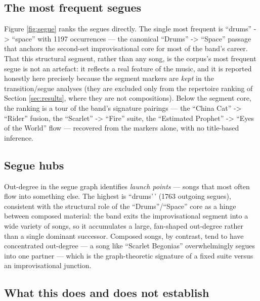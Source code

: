 \documentclass[
]{article}
\begin{document}
\subsection{The most frequent segues}\label{the-most-frequent-segues}

Figure \ref{fig:segue} ranks the segues directly. The single most
frequent is ``drums'' -\textgreater{} ``space'' with 1197 occurrences
--- the canonical ``Drums'' -\textgreater{} ``Space'' passage that
anchors the second-set improvisational core for most of the band's
career. That this structural segment, rather than any song, is the
corpus's most frequent segue is not an artefact: it reflects a real
feature of the music, and it is reported honestly here precisely because
the segment markers are \emph{kept} in the transition/segue analyses
(they are excluded only from the repertoire ranking of Section
\ref{sec:results}, where they are not compositions). Below the segment
core, the ranking is a tour of the band's signature pairings --- the
``China Cat'' -\textgreater{} ``Rider'' fusion, the ``Scarlet''
-\textgreater{} ``Fire'' suite, the ``Estimated Prophet''
-\textgreater{} ``Eyes of the World'' flow --- recovered from the
markers alone, with no title-based inference.

\subsection{Segue hubs}\label{segue-hubs}

Out-degree in the segue graph identifies \emph{launch points} --- songs
that most often flow into something else. The highest is ``drums'\,'
(1763 outgoing segues), consistent with the structural role of the
``Drums''/``Space'' core as a hinge between composed material: the band
exits the improvisational segment into a wide variety of songs, so it
accumulates a large, fan-shaped out-degree rather than a single dominant
successor. Composed songs, by contrast, tend to have concentrated
out-degree --- a song like ``Scarlet Begonias'' overwhelmingly segues
into one partner --- which is the graph-theoretic signature of a fixed
suite versus an improvisational junction.

\subsection{What this does and does not
establish}\label{what-this-does-and-does-not-establish}
\end{document}
